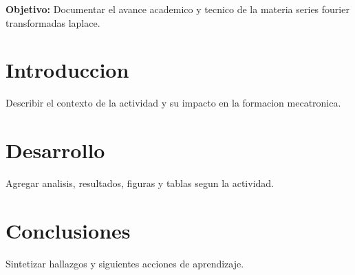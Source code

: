 \documentclass[spanish,letterpaper,oneside]{article}
\begin{document}
\templatePortrait
\templatePagecfg
\onehalfspacing

\begin{abstractd}
\textbf{Objetivo:} Documentar el avance academico y tecnico de la materia series fourier transformadas laplace.
\end{abstractd}

\templateIndex
\templateFinalcfg

\section{Introduccion}
Describir el contexto de la actividad y su impacto en la formacion mecatronica.

\section{Desarrollo}
Agregar analisis, resultados, figuras y tablas segun la actividad.

\section{Conclusiones}
Sintetizar hallazgos y siguientes acciones de aprendizaje.



\end{document}
